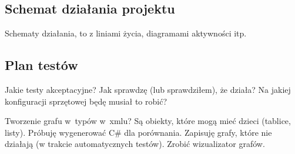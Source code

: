 %
%
%
%
%
%
%
%
%
%

\subsection{Schemat działania projektu}
Schematy działania, to z liniami życia, diagramami aktywności itp.

\subsection{Plan testów}
Jakie testy akceptacyjne? Jak sprawdzę (lub sprawdziłem), że działa? Na jakiej konfiguracji sprzętowej będę musiał to robić?

Tworzenie grafu w~typów w~xmlu? Są obiekty, które mogą mieć dzieci (tablice, listy). Próbuję wygenerować C\# dla porównania. Zapisuję grafy, które nie działają (w trakcie automatycznych testów). Zrobić wizualizator grafów.

